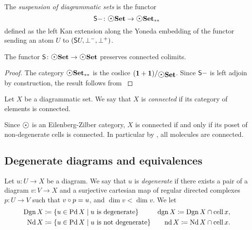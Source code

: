 \begin{dfn} [Suspension]
    The \emph{suspension of diagrammatic sets} is the functor
    \begin{equation*}
        \sus{-} \colon \dgmSet \to \bpt{\dgmSet}
    \end{equation*} 
    defined as the left Kan extension along the Yoneda embedding of the functor sending an atom \( U \) to \( (\mathsf{S}{U}, \bot^-, \bot^+) \).
\end{dfn}

\begin{prop} \label{prop:suspension_of_dgmSet}
    The functor \( \sus{} \colon \dgmSet \to \dgmSet \) preserves connected colimits.    
\end{prop}
\begin{proof}
    The category \( \bpt{\dgmSet} \) is the coslice \( \slice{(\pt + \pt)}{\dgmSet} \).
    Since \( \mathsf{S}{-} \) is left adjoin by construction, the result follows from \cite[Proposition 3.3.8]{riehl2019context}
\end{proof}

\begin{dfn} 
    Let \( X \) be a diagrammatic set. 
    We say that \( X \) is \emph{connected} if its category of elements is connected.
\end{dfn}

\begin{rmk} \label{rmk:ez_connected}
    Since \( \atom \) is an Eilenberg-Zilber category, \( X \) is connected if and only if its poset of non-degenerate cells is connected.
    In particular by \cite[Lemma 3.3.13]{hadzihasanovic2024combinatorics}, all molecules are connected.
\end{rmk}

\subsection{Degenerate diagrams and equivalences}

\begin{dfn} 
    Let \( u \colon U \to X \) be a diagram.
    We say that \( u \) is \emph{degenerate} if there exists a pair of a diagram \( v \colon V \to X \) and a surjective cartesian map of regular directed complexes \( p \colon U \to V \) such that \( v \circ p = u \), and \( \dim v < \dim v \). 
    We let
    \begin{align*}
        \operatorname{Dgn} X &\coloneqq \left\{ {u \in \operatorname{Pd} X \mid u \text{ is degenerate}} \right\} & \operatorname{dgn} X \coloneqq \operatorname{Dgn} X \cap \operatorname{cell} x,\\
        \operatorname{Nd} X & \coloneqq \left\{ {u \in \operatorname{Pd} X \mid u \text{ is not degenerate}} \right\} & \operatorname{nd} X \coloneqq \operatorname{Nd} X \cap \operatorname{cell} x.
    \end{align*}
\end{dfn}

